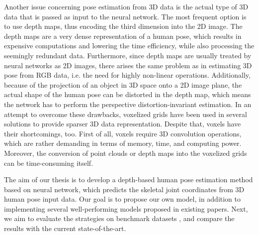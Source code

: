 \par
\vspace{5mm}
\noindent Another issue concerning pose estimation from 3D data is the actual type of 3D data that is passed as input to the neural network. The most frequent option is to use depth maps, thus encoding the third dimension into the 2D image. The depth maps are a very dense representation of a human pose, which results in expensive computations and lowering the time efficiency, while also processing the seemingly redundant data. Furthermore, since depth maps are usually treated by neural networks as 2D images, there arises the same problem as in estimating 3D pose from RGB data, i.e. the need for highly non-linear operations. Additionally, because of the projection of an object in 3D space onto a 2D image plane, the actual shape of the human pose can be distorted in the depth map, which means the network has to perform the perspective distortion-invariant estimation. In an attempt to overcome these drawbacks, voxelized grids have been used in several solutions to provide sparser 3D data representation. Despite that, voxels have their shortcomings, too. First of all, voxels require 3D convolution operations, which are rather demanding in terms of memory, time, and computing power. Moreover, the conversion of point clouds or depth maps into the voxelized grids can be time-consuming itself.\par
\vspace{5mm}
\noindent The aim of our thesis is to develop a depth-based human pose estimation method based on neural network, which predicts the skeletal joint coordinates from 3D human pose input data. %
Our goal is to propose our own model, in addition to implementing several well-performing models proposed in existing papers. Next, we aim to evaluate the strategies on %
benchmark datasets%
, and compare the results with the current state-of-the-art.\par